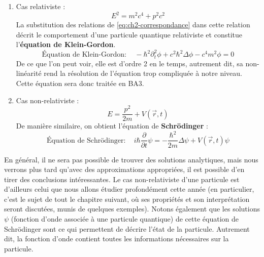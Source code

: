 \documentclass[../notesdecours]{subfiles}
\begin{document}
\begin{enumerate}[label =  (\alph*)]
\begin{enumerate}[label = \roman*)]
\item Cas relativiste : 
$$E^2 = m^2 c^4 + p^2 c^2$$
La substitution des relations de \eqref{eq:ch2-correspondance} dans cette relation décrit le comportement d'une particule quantique relativiste et constitue l'\textbf{équation de Klein-Gordon}.
\begin{equation} \label{eq:dirac}
\boxed{\text{Équation de Klein-Gordon} : \quad -\hbar ^2 \partial_t ^2 \phi + c^2 \hbar ^2 \Delta \phi - c^4 m^2 \phi = 0}
\end{equation}
De ce que l'on peut voir, elle est d'ordre 2 en le temps, autrement dit, sa non-linéarité rend la résolution de l'équation trop compliquée à notre niveau. Cette équation sera donc traitée en BA3.
\item Cas non-relativiste :
$$E = \dfrac{p^2}{2m} + V(\vec r, t)$$
De manière similaire, on obtient l'équation de \textbf{Schrödinger} :
\begin{equation} 
\boxed{\text{Équation de Schrödinger} : \quad
i\hbar \dfrac{\partial}{\partial t} \psi = -\dfrac{\hbar ^2}{2m} \Delta \psi + V(\vec r, t) \psi}
\end{equation}

\end{enumerate}
\end{enumerate}
En général, il ne sera pas possible de trouver des solutions analytiques, mais nous verrons plus tard qu'avec des approximations appropriées, il est possible
d'en tirer des conclusions intéressantes. Le cas non-relativiste d'une particule est d'ailleurs celui que nous allons étudier profondément cette année (en particulier, c'est le sujet de tout le chapitre suivant, où ses propriétés et son interprétation seront discutées, munis de quelques exemples).
Notons également que les solutions $\psi$ (fonction d'onde associée à une particule quantique) de cette équation de Schrödinger sont ce qui permettent de décrire l'état de la particule. Autrement dit, la fonction d'onde contient toutes les informations nécessaires sur la particule. 
\end{document}
